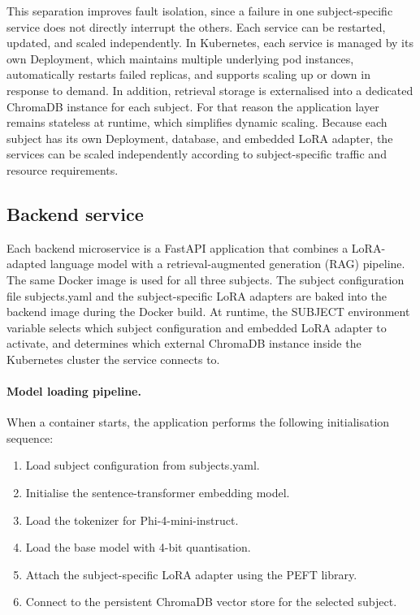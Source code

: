 This separation improves fault isolation, since a failure in one subject-specific service does not directly interrupt the others. Each service can be restarted, updated, and scaled independently. In Kubernetes, each service is managed by its own Deployment, which maintains multiple underlying pod instances, automatically restarts failed replicas, and supports scaling up or down in response to demand. In addition, retrieval storage is externalised into a dedicated ChromaDB instance for each subject. For that reason the application layer remains stateless at runtime, which simplifies dynamic scaling. Because each subject has its own Deployment, database, and embedded LoRA adapter, the services can be scaled independently according to subject-specific traffic and resource requirements.

\subsection{Backend service}

Each backend microservice is a FastAPI application that combines a LoRA-adapted language model with a retrieval-augmented generation (RAG) pipeline. The same Docker image is used for all three subjects. The subject configuration file subjects.yaml and the subject-specific LoRA adapters are baked into the backend image during the Docker build. At runtime, the SUBJECT environment variable selects which subject configuration and embedded LoRA adapter to activate, and determines which external ChromaDB instance inside the Kubernetes cluster the service connects to.

\paragraph{Model loading pipeline.}
When a container starts, the application performs the following initialisation sequence:
\begin{enumerate}
    \item Load subject configuration from subjects.yaml.
    \item Initialise the sentence-transformer embedding model.
    \item Load the tokenizer for Phi-4-mini-instruct.
    \item Load the base model with 4-bit quantisation.
    \item Attach the subject-specific LoRA adapter using the PEFT library.
    \item Connect to the persistent ChromaDB vector store for the selected subject.
\end{enumerate}


